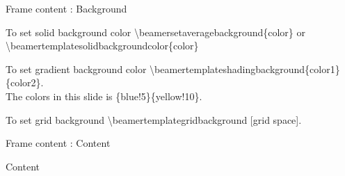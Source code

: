 \documentclass[ aspectratio=169,  10pt,blue,xcolor=pdftex,dvipsnames,table,handout,notes]{beamer}
\begin{document}
		\begin{frame}[t]{Frame content : Background}


			\begin{block} {To set solid background color}
			\textbackslash beamersetaveragebackground\{color\} or\\
			\textbackslash beamertemplatesolidbackgroundcolor\{color\}
			\end{block}


			\begin{block} {To set gradient background color}
			\textbackslash beamertemplateshadingbackground\{color1\}\{color2\}.\\
			The colors in this slide is \{blue!5\}\{yellow!10\}.
			\end{block}


			\begin{block} {To set grid background}
			\textbackslash beamertemplategridbackground [grid space].
			\end{block}


		\end{frame}


		\begin{frame}{Frame content : Content}

			\begin{block} {Content}
			\end{block}

		\end{frame}





\end{document}
